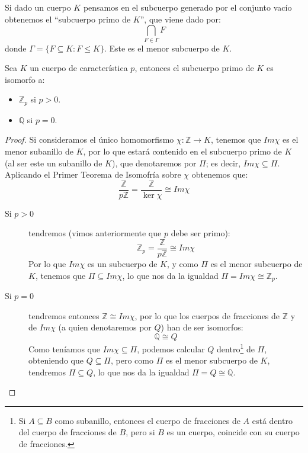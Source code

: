 \begin{definicion}
    Si dado un cuerpo $K$ pensamos en el subcuerpo generado por el conjunto vacío obtenemos el ``subcuerpo primo de $K$'', que viene dado por:
    \begin{equation*}
        \bigcap_{F\in \Gamma} F
    \end{equation*}
    donde $\Gamma = \{F\subseteq K : F\leq K\}$. Este es el menor subcuerpo de $K$.
\end{definicion}

\begin{prop}
    Sea $K$ un cuerpo de característica $p$, entonces el subcuerpo primo de $K$ es isomorfo a:
    \begin{itemize}
        \item $\mathbb{Z}_p$ si $p>0$.
        \item $\mathbb{Q}$ si $p = 0$.
    \end{itemize}
    \begin{proof}
        Si consideramos el único homomorfismo $\chi:\mathbb{Z}\to K$, tenemos que $Im\chi$ es el menor subanillo de $K$, por lo que estará contenido en el subcuerpo primo de $K$ (al ser este un subanillo de $K$), que denotaremos por $\Pi$; es decir, $Im\chi \subseteq \Pi$. Aplicando el Primer Teorema de Isomofría sobre $\chi$ obtenemos que:
        \begin{equation*}
            \dfrac{\mathbb{Z}}{p\mathbb{Z}} = \dfrac{\mathbb{Z}}{\ker\chi} \cong Im\chi 
        \end{equation*}
        \begin{description}
            \item [Si $p>0$] tendremos (vimos anteriormente que $p$ debe ser primo):
                \begin{equation*}
                    \mathbb{Z}_p = \dfrac{\mathbb{Z}}{p\mathbb{Z}} \cong Im\chi
                \end{equation*}
                Por lo que $Im\chi$ es un subcuerpo de $K$, y como $\Pi$ es el menor subcuerpo de $K$, tenemos que $\Pi\subseteq Im\chi$, lo que nos da la igualdad $\Pi = Im\chi \cong \mathbb{Z}_p$.
            \item [Si $p=0$] tendremos entonces $\mathbb{Z}\cong Im\chi$, por lo que los cuerpos de fracciones de $\mathbb{Z}$ y de $Im\chi$ (a quien denotaremos por $Q$) han de ser isomorfos:
                \begin{equation*}
                    \mathbb{Q}\cong Q
                \end{equation*}
                Como teníamos que $Im\chi \subseteq \Pi$, podemos calcular $Q$ dentro\footnote{Si $A\subseteq B$ como subanillo, entonces el cuerpo de fracciones de $A$ está dentro del cuerpo de fracciones de $B$, pero si $B$ es un cuerpo, coincide con su cuerpo de fracciones.} de $\Pi$, obteniendo que $Q\subseteq \Pi$, pero como $\Pi$ es el menor subcuerpo de $K$, tendremos $\Pi\subseteq Q$, lo que nos da la igualdad $\Pi = Q \cong \mathbb{Q}$.\qedhere
        \end{description}
    \end{proof}
\end{prop}

